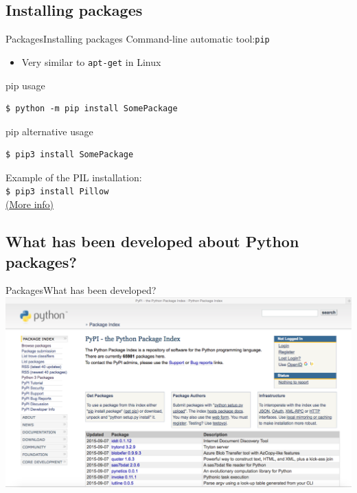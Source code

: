\documentclass[10pt,compress]{beamer} %
\begin{document}
\subsection{Installing packages}
\begin{frame}[fragile]{Packages}{Installing packages}
	Command-line automatic tool:\texttt{pip} 
		\begin{itemize}
			\item Very similar to \texttt{apt-get} in Linux
		\end{itemize}

	\begin{block}{pip usage}
	\vspace{-0.2cm}
	\begin{verbatim}
$ python -m pip install SomePackage
\end{verbatim}
	\vspace{-0.2cm}
\end{block}

	\begin{block}{pip alternative usage}
	\vspace{-0.2cm}
	\begin{verbatim}
$ pip3 install SomePackage
\end{verbatim}
	\vspace{-0.2cm}
\end{block}
	Example of the PIL  installation:\\
	\texttt{\$ pip3 install Pillow}\\
\alert{\href{http://recursospython.com/guias-y-manuales/instalacion-y-utilizacion-de-pip-en-windows-linux-y-os-x/}{(More info)}}
\end{frame}

\subsection{What has been developed about Python packages?}
\begin{frame}{Packages}{What has been developed?}
\centering \includegraphics[scale=0.267]{figs/PyPI.pdf}\\
\end{frame}
\end{document}
